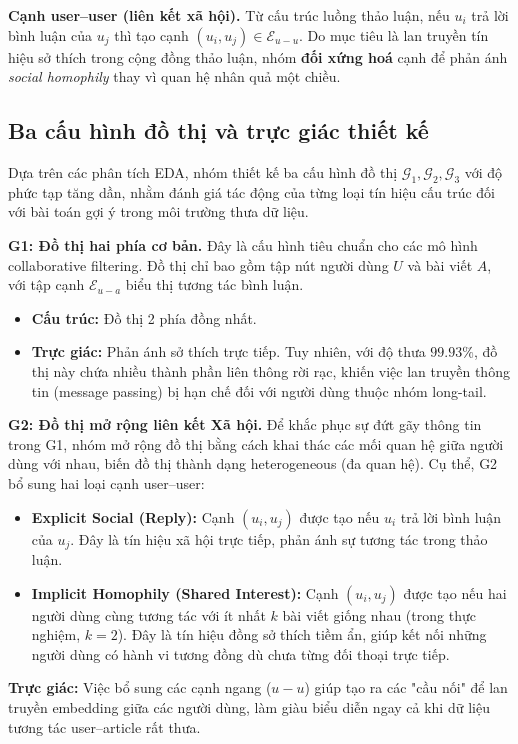 \documentclass[11pt]{article}
\begin{document}
\textbf{Cạnh user--user (liên kết xã hội).} Từ cấu trúc luồng thảo luận, nếu $u_i$ trả lời bình luận của $u_j$ thì tạo cạnh $(u_i,u_j)\in \mathcal{E}_{u-u}$. Do mục tiêu là lan truyền tín hiệu sở thích trong cộng đồng thảo luận, nhóm \textbf{đối xứng hoá} cạnh để phản ánh \textit{social homophily} thay vì quan hệ nhân quả một chiều.

\subsection{Ba cấu hình đồ thị và trực giác thiết kế}
\label{sec:graph_configs}

Dựa trên các phân tích EDA, nhóm thiết kế ba cấu hình đồ thị $\mathcal{G}_1, \mathcal{G}_2, \mathcal{G}_3$ với độ phức tạp tăng dần, nhằm đánh giá tác động của từng loại tín hiệu cấu trúc đối với bài toán gợi ý trong môi trường thưa dữ liệu.

\textbf{G1: Đồ thị hai phía cơ bản.}
Đây là cấu hình tiêu chuẩn cho các mô hình collaborative filtering. Đồ thị chỉ bao gồm tập nút người dùng $U$ và bài viết $A$, với tập cạnh $\mathcal{E}_{u-a}$ biểu thị tương tác bình luận.
\begin{itemize}
    \item \textbf{Cấu trúc:} Đồ thị 2 phía đồng nhất.
    \item \textbf{Trực giác:} Phản ánh sở thích trực tiếp. Tuy nhiên, với độ thưa $99.93\%$, đồ thị này chứa nhiều thành phần liên thông rời rạc, khiến việc lan truyền thông tin (message passing) bị hạn chế đối với người dùng thuộc nhóm long-tail.
\end{itemize}

\textbf{G2: Đồ thị mở rộng liên kết Xã hội.}
Để khắc phục sự đứt gãy thông tin trong G1, nhóm mở rộng đồ thị bằng cách khai thác các mối quan hệ giữa người dùng với nhau, biến đồ thị thành dạng heterogeneous (đa quan hệ). Cụ thể, G2 bổ sung hai loại cạnh user--user:
\begin{itemize}
    \item \textbf{Explicit Social (Reply):} Cạnh $(u_i, u_j)$ được tạo nếu $u_i$ trả lời bình luận của $u_j$. Đây là tín hiệu xã hội trực tiếp, phản ánh sự tương tác trong thảo luận.
    \item \textbf{Implicit Homophily (Shared Interest):} Cạnh $(u_i, u_j)$ được tạo nếu hai người dùng cùng tương tác với ít nhất $k$ bài viết giống nhau (trong thực nghiệm, $k=2$). Đây là tín hiệu đồng sở thích tiềm ẩn, giúp kết nối những người dùng có hành vi tương đồng dù chưa từng đối thoại trực tiếp.
\end{itemize}
\textbf{Trực giác:} Việc bổ sung các cạnh ngang ($u-u$) giúp tạo ra các "cầu nối" để lan truyền embedding giữa các người dùng, làm giàu biểu diễn ngay cả khi dữ liệu tương tác user--article rất thưa.
\end{document}
